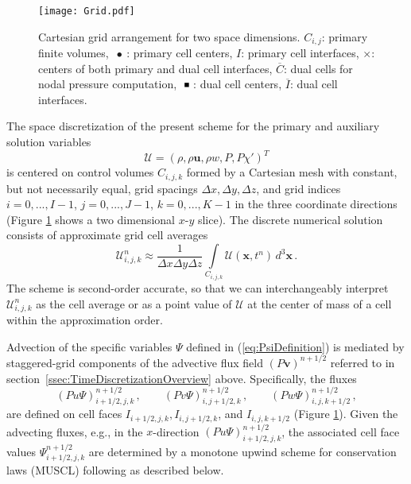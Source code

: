 \documentclass[12pt,a4paper]{article}
\theoremstyle{definition}
\newcommand{\eq}[1]{(\ref{#1})}
\newcommand{\vect}[1]{{\mathbf{#1}}}
\newcommand{\vu}{\vect{u}}
\newcommand{\vv}{\vect{v}}
\newcommand{\vx}{\vect{x}}
\newcommand{\half}{1/2}
\newcommand{\dz}{\Delta z}
\newcommand{\chiprime}{{\chi'}}
\newcommand{\Sol}{\mathcal{U}}
\newcommand{\dx}{{\Delta x}}
\newcommand{\dy}{{\Delta y}}
\begin{document}
\begin{figure}
\centering
 \texttt{[image: Grid.pdf]}
\caption{Cartesian grid arrangement for two space dimensions. 
$C_{i,j}$: primary finite volumes, 
$\ \bullet\ $: primary cell centers, $I$: primary cell interfaces,
$\times$: centers of both primary and dual cell interfaces, 
$\overline{C}$: dual cells for nodal pressure computation, $\ \rule[1pt]{4pt}{4pt}\ $:
dual cell centers, $\overline{I}$: dual cell interfaces.
\label{fig:GridArrangement}}
\end{figure}

The space discretization of the present scheme for the primary
and auxiliary solution variables 
%
\begin{equation}
\Sol = \left(\rho, \rho\vu, \rho w, P, P\chiprime \right)^T
\end{equation}
%
is centered on control volumes $C_{i,j,k}$ formed by a Cartesian mesh with constant,
but not necessarily equal, grid spacings $\dx, \dy, \dz$, and grid indices 
$i = 0, ..., I-1$, $j = 0, ..., J-1$, $k = 0, ..., K-1$ in the three coordinate directions (Figure \ref{fig:GridArrangement} shows a two dimensional $x$-$y$ slice). 
The discrete numerical solution consists of approximate grid cell averages 
%
\begin{equation}
\Sol_{i,j,k}^n \approx 
\frac{1}{\dx \dy \dz}\int\limits_{C_{i,j,k}} \Sol(\vx,t^n)\, d^3\vx\,.
\end{equation}
%
The scheme is second-order accurate, so that we can interchangeably interpret 
$\Sol_{i,j,k}^n$ as the cell average or as a point value of $\Sol$ at the center of 
mass of a cell within the approximation order.  

Advection of the specific variables $\Psi$ defined in \eq{eq:PsiDefinition} is mediated 
by staggered-grid components of the advective flux field $(P\vv)^{n+\half}$ referred
to in section~\ref{ssec:TimeDiscretizationOverview} 
above. Specifically, the fluxes
%
\begin{equation}\label{eq:DiscreteAdvectiveFluxes}
(Pu \Psi)^{n+\half}_{i+\half,j,k}\,,
\qquad
(Pv \Psi)^{n+\half}_{i,j+\half,k}\,, 
\qquad
(Pw \Psi)^{n+\half}_{i,j,k+\half}\,,
\end{equation}
%
are defined on cell faces $I_{i+\half,j,k}, I_{i,j+\half,k}$, and $I_{i,j,k+\half}$ 
(Figure \ref{fig:GridArrangement}). 
Given the advecting fluxes, e.g., in the $x$-direction 
$(Pu \Psi)^{n+\half}_{i+\half,j,k}$, the associated cell face values 
$\Psi^{n+\half}_{i+\half,j,k}$ 
are determined by a monotone upwind scheme for conservation laws (MUSCL) following 
\cite{vanLeer2006} as described below.
\end{document}
